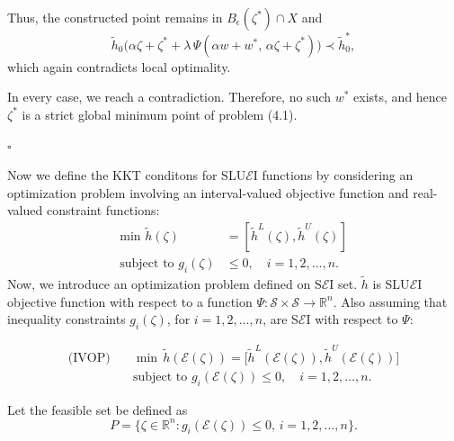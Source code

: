 \documentclass[12pt, reqno]{amsart}
\theoremstyle{definition}
\theoremstyle{remark}
\numberwithin{equation}{section}
\begin{document}
Thus, the constructed point remains in $B_\epsilon(\zeta^*) \cap X$ and
\[
\tilde{h}_0\!\big(\alpha \zeta + \zeta^* + \lambda\, \Psi(\alpha w + w^*,\, \alpha \zeta + \zeta^*)\big) \prec \tilde{h}_0^*,
\]
which again contradicts local optimality.

\vspace{0.2cm}
\noindent
In every case, we reach a contradiction. Therefore, no such $w^*$ exists, and hence $\zeta^*$ is a strict global minimum point of problem (4.1).

\hfill$\square$


Now we define the KKT conditons for SLU$\mathcal{E}$I functions by considering an optimization problem involving an interval-valued objective function and real-valued constraint functions:
\begin{align*}
    \text{min~} \tilde{h}(\mathit{\zeta})& =  [\tilde{h}^L(\mathit{\zeta}), \tilde{h}^U(\mathit{\zeta})]\\
    \text{subject to~}   g_i (\mathit{\zeta}) &\leq 0,\quad i = 1,2,\ldots,n.
\end{align*}
\noindent
Now, we introduce an optimization problem defined on S$\mathcal{\mathcal{E}}$I set.  $\tilde{h}$ is SLU$\mathcal{\mathcal{E}}$I objective function with respect to a function $\Psi : \mathcal{S} \times \mathcal{S} \to \mathbb{R}^n$. Also assuming that inequality constraints $g_i(\mathit{\zeta})$, for $i = 1, 2, \ldots, n$, are S$\mathcal{\mathcal{E}}$I with respect to $\Psi$:

\begin{equation*}
    \begin{aligned}
        \text{(IVOP)} \quad & \min \,\tilde{h}(\mathcal{\mathcal{E}}(\mathit{\zeta} )) = \big[ \tilde{h}^L(\mathcal{\mathcal{E}}(\mathit{\zeta} )), \tilde{h}^U(\mathcal{\mathcal{E}}(\mathit{\zeta} )) \big] \\
& \text{subject to } g_i(\mathcal{\mathcal{E}}(\mathit{\zeta} )) \leq 0, \quad i = 1, 2, \ldots, n.
    \end{aligned}
\end{equation*}

Let the feasible set be defined as
\begin{equation*}
    P = \big\{ \mathit{\zeta}  \in \mathbb{R}^n : g_i(\mathcal{\mathcal{E}}(\mathit{\zeta} )) \leq 0, \, i = 1, 2, \ldots, n \big\}.
\end{equation*}
\end{document}
